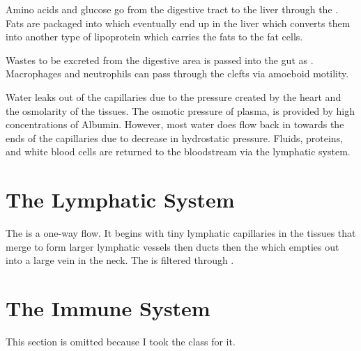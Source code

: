 \documentclass[../Bio_chemistryReview.tex]{subfiles}
\begin{document}
Amino acids and glucose go from the digestive tract to the liver through the
. Fats are packaged into 
which eventually end up in the liver which converts them into another type of
lipoprotein which carries the fats to the fat cells.\par

Wastes to be excreted from the digestive area is passed into the gut as
. Macrophages and neutrophils can pass through the clefts via
amoeboid motility.\par

Water leaks out of the capillaries due to the pressure created by the heart and
the osmolarity of the tissues. The osmotic pressure of plasma,
 is provided by high concentrations of Albumin.
However, most water does flow back in towards the ends of the capillaries due to
decrease in hydrostatic pressure. Fluids, proteins, and white blood cells are
returned to the bloodstream via the lymphatic system.

\section{The Lymphatic System}
The  is a one-way flow. It begins with tiny lymphatic
capillaries in the tissues that merge to form larger lymphatic vessels then
ducts then the  which empties out into a large vein in
the neck. The  is filtered through .

\section{The Immune System}
This section is omitted because I took the class for it.
\end{document}
